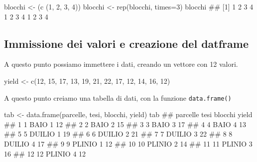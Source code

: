\documentclass[a4paper,12pt,oneside]{book}
\newenvironment{Shaded}{\begin{snugshade}}{\end{snugshade}}
\newcommand{\DecValTok}[1]{#1}
\newcommand{\DocumentationTok}[1]{#1}
\newcommand{\OtherTok}[1]{#1}
\newcommand{\FunctionTok}[1]{#1}
\newcommand{\AttributeTok}[1]{#1}
\newcommand{\NormalTok}[1]{#1}
\begin{document}
\begin{Shaded}
\begin{Highlighting}[]
\NormalTok{blocchi  }\OtherTok{\textless{}{-}}\NormalTok{  (}\FunctionTok{c}\NormalTok{ (}\DecValTok{1}\NormalTok{, }\DecValTok{2}\NormalTok{, }\DecValTok{3}\NormalTok{, }\DecValTok{4}\NormalTok{))}
\NormalTok{blocchi }\OtherTok{\textless{}{-}} \FunctionTok{rep}\NormalTok{(blocchi, }\AttributeTok{times=}\DecValTok{3}\NormalTok{)}
\NormalTok{blocchi}
\DocumentationTok{\#\#  [1] 1 2 3 4 1 2 3 4 1 2 3 4}
\end{Highlighting}
\end{Shaded}

\hypertarget{immissione-dei-valori-e-creazione-del-datframe}{%
\subsection*{Immissione dei valori e creazione del datframe}\label{immissione-dei-valori-e-creazione-del-datframe}}

A questo punto possiamo immettere i dati, creando un vettore con 12 valori.

\begin{Shaded}
\begin{Highlighting}[]
\NormalTok{yield }\OtherTok{\textless{}{-}} \FunctionTok{c}\NormalTok{(}\DecValTok{12}\NormalTok{, }\DecValTok{15}\NormalTok{, }\DecValTok{17}\NormalTok{, }\DecValTok{13}\NormalTok{, }\DecValTok{19}\NormalTok{, }\DecValTok{21}\NormalTok{, }\DecValTok{22}\NormalTok{, }\DecValTok{17}\NormalTok{, }\DecValTok{12}\NormalTok{, }\DecValTok{14}\NormalTok{, }\DecValTok{16}\NormalTok{, }\DecValTok{12}\NormalTok{)}
\end{Highlighting}
\end{Shaded}

A questo punto creiamo una tabella di dati, con la funzione \texttt{data.frame()}

\begin{Shaded}
\begin{Highlighting}[]
\NormalTok{tab }\OtherTok{\textless{}{-}} \FunctionTok{data.frame}\NormalTok{(parcelle, tesi, blocchi, yield)}
\NormalTok{tab}
\DocumentationTok{\#\#    parcelle   tesi blocchi yield}
\DocumentationTok{\#\# 1         1   BAIO       1    12}
\DocumentationTok{\#\# 2         2   BAIO       2    15}
\DocumentationTok{\#\# 3         3   BAIO       3    17}
\DocumentationTok{\#\# 4         4   BAIO       4    13}
\DocumentationTok{\#\# 5         5 DUILIO       1    19}
\DocumentationTok{\#\# 6         6 DUILIO       2    21}
\DocumentationTok{\#\# 7         7 DUILIO       3    22}
\DocumentationTok{\#\# 8         8 DUILIO       4    17}
\DocumentationTok{\#\# 9         9 PLINIO       1    12}
\DocumentationTok{\#\# 10       10 PLINIO       2    14}
\DocumentationTok{\#\# 11       11 PLINIO       3    16}
\DocumentationTok{\#\# 12       12 PLINIO       4    12}
\end{Highlighting}
\end{Shaded}
\end{document}
